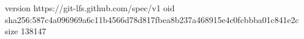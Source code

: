 version https://git-lfs.github.com/spec/v1
oid sha256:587c4a096969a6c11b4566d78d817fbea8b237a468915e4c0fcbbba01c841e2c
size 138147
